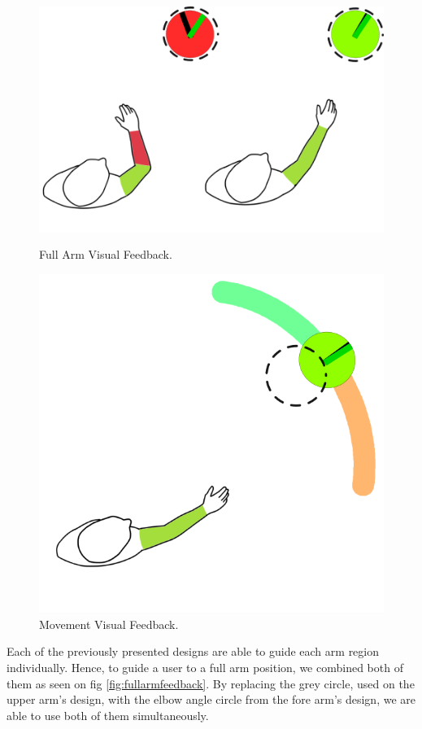 \begin{figure}[!t]
  \centering
  \includegraphics[width=0.8\linewidth]{imgs/approach/fullarmfeedback}
    \caption{Full Arm Visual Feedback.}
    \label{fig:fullarmfeedback}
    \endminipage\hfill
{}
  \centering
  \includegraphics[width=0.8\linewidth]{imgs/approach/movementguidancefeedback}
    \caption{Movement Visual Feedback.}
    \label{fig:movementguidancefeedback}
    \endminipage
\end{figure}

Each of the previously presented designs are able to guide each arm region individually.
Hence, to guide a user to a full arm position, we combined both of them as seen on fig \ref{fig:fullarmfeedback}. 
By replacing the grey circle, used on the upper arm's design, with the elbow angle circle from the fore arm's design, we are able to use both of them simultaneously. 

